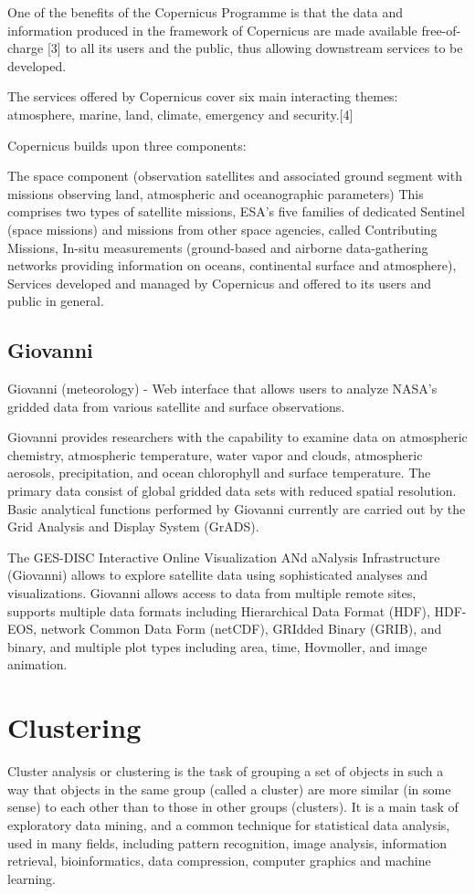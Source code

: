 \documentclass[12pt]{report}	%
\begin{document}
One of the benefits of the Copernicus Programme is that the data and information produced in the framework of Copernicus are made available free-of-charge [3] to all its users and the public, thus allowing downstream services to be developed.

The services offered by Copernicus cover six main interacting themes: atmosphere, marine, land, climate, emergency and security.[4]

Copernicus builds upon three components:

The space component (observation satellites and associated ground segment with missions observing land, atmospheric and oceanographic parameters) This comprises two types of satellite missions, ESA's five families of dedicated Sentinel (space missions) and missions from other space agencies, called Contributing Missions,
In-situ measurements (ground-based and airborne data-gathering networks providing information on oceans, continental surface and atmosphere),
Services developed and managed by Copernicus and offered to its users and public in general.

\section{Giovanni}
Giovanni (meteorology) - Web interface that allows users to analyze NASA's gridded data from various satellite and surface observations.

Giovanni provides researchers with the capability to examine data on atmospheric chemistry, atmospheric temperature, water vapor and clouds, atmospheric aerosols, precipitation, and ocean chlorophyll and surface temperature. The primary data consist of global gridded data sets with reduced spatial resolution. Basic analytical functions performed by Giovanni currently are carried out by the Grid Analysis and Display System (GrADS).

The GES-DISC Interactive Online Visualization ANd aNalysis Infrastructure (Giovanni) allows to explore satellite data using sophisticated analyses and visualizations. Giovanni allows access to data from multiple remote sites, supports multiple data formats including Hierarchical Data Format (HDF), HDF-EOS, network Common Data Form (netCDF), GRIdded Binary (GRIB), and binary, and multiple plot types including area, time, Hovmoller, and image animation.



\chapter{Clustering}
Cluster analysis or clustering is the task of grouping a set of objects in such a way that objects in the same group (called a cluster) are more similar (in some sense) to each other than to those in other groups (clusters). It is a main task of exploratory data mining, and a common technique for statistical data analysis, used in many fields, including pattern recognition, image analysis, information retrieval, bioinformatics, data compression, computer graphics and machine learning.
\end{document}
